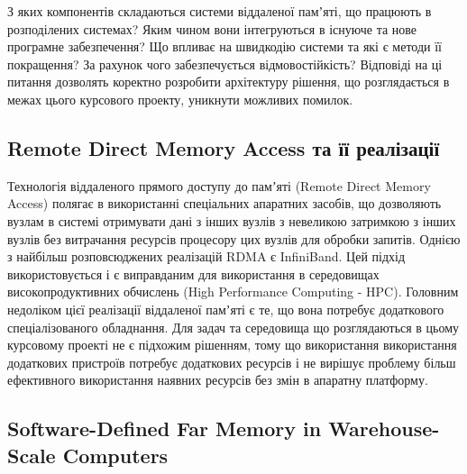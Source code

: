 З яких компонентів складаються системи віддаленої памʼяті, що працюють в розподілених системах?
Яким чином вони інтегруються в існуюче та нове програмне забезпечення?
Що впливає на швидкодію системи та які є методи її покращення?
За рахунок чого забезпечується відмовостійкість?
Відповіді на ці питання дозволять коректно розробити архітектуру рішення, що розглядається в межах цього курсового проекту, уникнути можливих помилок.

\subsection {Remote Direct Memory Access та її реалізації}

Технологія віддаленого прямого доступу до памʼяті (Remote Direct Memory Access) полягає в використанні спеціальних апаратних засобів, що дозволяють вузлам в системі отримувати дані з інших вузлів з невеликою затримкою з інших вузлів без витрачання ресурсів процесору цих вузлів для обробки запитів. Однією з найбільш розповсюджених реалізацій RDMA є InfiniBand. Цей підхід використовується і є виправданим для використання в середовищах високопродуктивних обчислень (High Performance Computing - HPC). Головним недоліком цієї реалізації віддаленої памʼяті є те, що вона потребує додаткового спеціалізованого обладнання. Для задач та середовища що розглядаються в цьому курсовому проекті не є підхожим рішенням, тому що використання використання додаткових пристроїв потребує додаткових ресурсів і не вирішує проблему більш ефективного використання наявних ресурсів без змін в апаратну платформу.

\subsection {Software-Defined Far Memory in Warehouse-Scale Computers}

